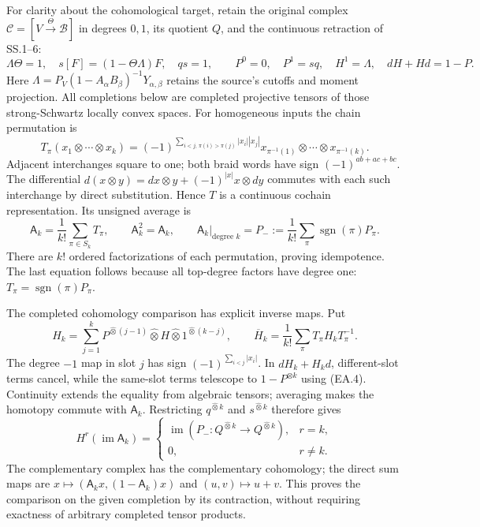 For clarity about the cohomological target, retain the original complex
\(\mathcal C=[V\xrightarrow{\Theta}\mathscr B]\) in degrees \(0,1\),
its quotient \(Q\), and the continuous retraction of SS.1--6:
\[
 \Lambda\Theta=1,\quad s[F]=(1-\Theta\Lambda)F,\quad qs=1,
 \qquad P^0=0,\quad P^1=sq,\quad H^1=\Lambda,
 \quad dH+Hd=1-P.
 \tag{EA.4}
\]
Here \(\Lambda=P_V(1-A_\alpha B_\beta)^{-1}Y_{\alpha,\beta}\)
retains the source's cutoffs and moment projection.  All completions below
are completed projective tensors of those strong-Schwartz locally convex
spaces.  For homogeneous inputs the chain permutation is
\[
 T_\pi(x_1\otimes\cdots\otimes x_k)=
 (-1)^{\sum_{i<j,\,\pi(i)>\pi(j)}|x_i||x_j|}
 x_{\pi^{-1}(1)}\otimes\cdots\otimes x_{\pi^{-1}(k)}.
 \tag{EA.5}
\]
Adjacent interchanges square to one; both braid words have sign
\((-1)^{ab+ac+bc}\).  The differential
\(d(x\otimes y)=dx\otimes y+(-1)^{|x|}x\otimes dy\)
commutes with each such interchange by direct substitution.  Hence
\(T\) is a continuous cochain representation.  Its unsigned average is
\[
 \mathsf A_k=\frac1{k!}\sum_{\pi\in S_k}T_\pi,
 \qquad \mathsf A_k^2=\mathsf A_k,
 \qquad \left.\mathsf A_k\right|_{\text{degree }k}=P_-:=\frac1{k!}
                         \sum_\pi\operatorname{sgn}(\pi)P_\pi.
 \tag{EA.6}
\]
There are \(k!\) ordered factorizations of each permutation, proving
idempotence.  The last equation follows because all top-degree factors
have degree one: \(T_\pi=\operatorname{sgn}(\pi)P_\pi\).

The completed cohomology comparison has explicit inverse maps.  Put
\[
 H_k=\sum_{j=1}^k P^{\widehat\otimes(j-1)}\widehat\otimes H
                    \widehat\otimes1^{\widehat\otimes(k-j)},
 \qquad \overline H_k=\frac1{k!}\sum_\pi T_\pi H_kT_\pi^{-1}.
 \tag{EA.7}
\]
The degree \(-1\) map in slot \(j\) has sign
\((-1)^{\sum_{i<j}|x_i|}\).  In \(dH_k+H_kd\), different-slot
terms cancel, while the same-slot terms telescope to \(1-P^{\otimes k}\)
using (EA.4).  Continuity extends the equality from algebraic tensors;
averaging makes the homotopy commute with \(\mathsf A_k\).  Restricting
\(q^{\widehat\otimes k}\) and \(s^{\widehat\otimes k}\) therefore gives
\[
 H^r(\operatorname{im}\mathsf A_k)=
 \begin{cases}\operatorname{im}(P_-:Q^{\widehat\otimes k}
                                      \to Q^{\widehat\otimes k}),&r=k,\\
 0,&r\ne k.
 \end{cases}\tag{EA.8}
\]
The complementary complex has the complementary cohomology; the direct
sum maps are \(x\mapsto(\mathsf A_kx,(1-\mathsf A_k)x)\) and
\((u,v)\mapsto u+v\).  This proves the comparison on the given
completion by its contraction, without requiring exactness of arbitrary
completed tensor products.

